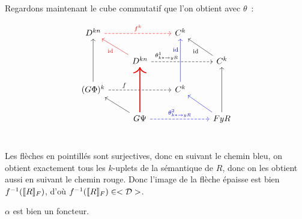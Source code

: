 \begin{pv}
    Regardons maintenant le cube commutatif que l'on obtient avec $\theta$~:

    \[\begin{tikzcd}
        D^{kn}\arrow[rr, dashed, red, "f^k"] & &
            C^k & \\
        & D^{kn}\arrow[ul, red, "\id"]
                \arrow[rr, near start, dashed, "\theta_{k\ast\rightarrow yR}^1"] & &
            C^k\arrow[ul, "\id"] \\
        (G\Phi)^k\arrow[uu]\arrow[rr, near start, dashed, "f"] & &
            C^k\arrow[uu, near end, blue, "\id"] & \\
        & G\Psi\arrow[ul]\arrow[uu, red, very thick]
               \arrow[rr, dashed, blue, "\theta_{k\ast\rightarrow yR}^2"] & &
            FyR\arrow[uu]\arrow[ul, blue] \\
    \end{tikzcd}\]

    Les flèches en pointillés sont surjectives, donc en suivant le chemin bleu, on obtient
    exactement tous les $k$-uplets de la sémantique de $R$, donc on les obtient aussi
    en suivant le chemin rouge. Donc l'image de la flèche épaisse est bien
    $f^{-1}(\llbracket {R} \rrbracket_F)$, d'où $f^{-1}(\llbracket {R} \rrbracket_F)\in<\mathcal{D}>$.
\end{pv}

\begin{prop}
    $\alpha$ est bien un foncteur.
\end{prop}

